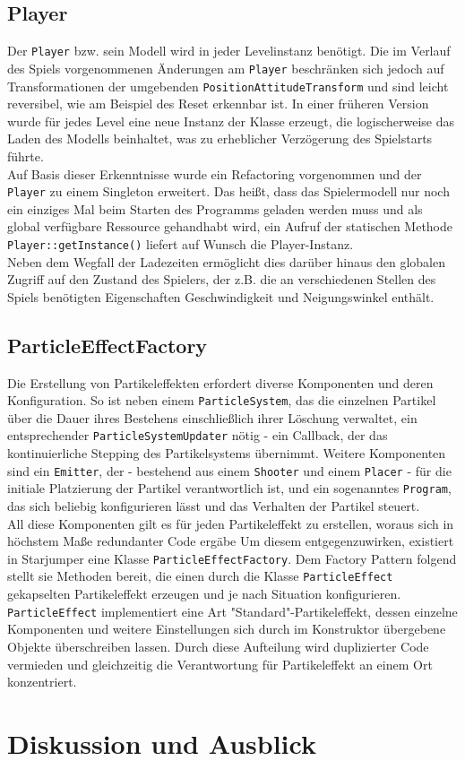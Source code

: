 \documentclass{llncs}
\begin{document}
\subsection{Player}
Der \texttt{Player} bzw. sein Modell wird in jeder Levelinstanz ben\"otigt. Die im Verlauf des Spiels vorgenommenen \"Anderungen
am \texttt{Player} beschr\"anken sich jedoch auf Transformationen der umgebenden \texttt{PositionAttitudeTransform} und sind leicht reversibel,
wie am Beispiel des Reset erkennbar ist. In einer fr\"uheren Version wurde f\"ur jedes Level eine neue Instanz der Klasse
erzeugt, die logischerweise das Laden des Modells beinhaltet, was zu erheblicher Verz\"ogerung des Spielstarts f\"uhrte.\\
Auf Basis dieser Erkenntnisse wurde ein Refactoring vorgenommen und der \texttt{Player} zu einem Singleton erweitert. Das hei\ss t,
dass das Spielermodell nur noch ein einziges Mal beim Starten des Programms geladen werden muss und als global verf\"ugbare
Ressource gehandhabt wird, ein Aufruf der statischen Methode \texttt{Player::getInstance()} liefert auf Wunsch die Player-Instanz.\\
Neben dem Wegfall der Ladezeiten erm\"oglicht dies dar\"uber hinaus den globalen Zugriff auf den Zustand des Spielers,
der z.B. die an verschiedenen Stellen des Spiels ben\"otigten Eigenschaften Geschwindigkeit und Neigungswinkel enth\"alt.

\subsection{ParticleEffectFactory}
Die Erstellung von Partikeleffekten erfordert diverse Komponenten und deren Konfiguration. So ist neben einem \texttt{ParticleSystem}, das
die einzelnen Partikel \"uber die Dauer ihres Bestehens einschlie\ss lich ihrer L\"oschung verwaltet, ein entsprechender
\texttt{ParticleSystemUpdater} n\"otig - ein Callback, der das kontinuierliche Stepping des Partikelsystems \"ubernimmt. Weitere Komponenten
sind ein \texttt{Emitter}, der - bestehend aus einem \texttt{Shooter} und einem \texttt{Placer} - f\"ur die initiale Platzierung der Partikel verantwortlich
ist, und ein sogenanntes \texttt{Program}, das sich beliebig konfigurieren l\"asst und das Verhalten der Partikel steuert.\\
All diese Komponenten gilt es f\"ur jeden Partikeleffekt zu erstellen, woraus sich in h\"ochstem Ma\ss e redundanter Code erg\"abe
Um diesem entgegenzuwirken, existiert in Starjumper eine Klasse \texttt{ParticleEffectFactory}. Dem Factory Pattern folgend stellt sie Methoden
bereit, die einen durch die Klasse \texttt{ParticleEffect} gekapselten Partikeleffekt erzeugen und je nach Situation konfigurieren.\\
\texttt{ParticleEffect} implementiert eine Art "Standard"-Partikeleffekt, dessen einzelne Komponenten und weitere Einstellungen sich
durch im Konstruktor \"ubergebene Objekte \"uberschreiben lassen. Durch diese Aufteilung wird duplizierter Code vermieden und
gleichzeitig die Verantwortung f\"ur Partikeleffekt an einem Ort konzentriert.


\section{Diskussion und Ausblick}
\end{document}
